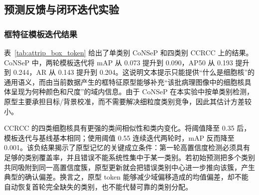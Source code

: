 \begin{table}[t]
\caption{学生网络结构对比}
\label{tab:attrip_architecture}
\begin{center}
\end{center}
\vskip -0.15in
\end{table}

\subsection{预测反馈与闭环迭代实验}

\subsubsection{框特征模板迭代结果}

表~\ref{tab:attrip_box_token} 给出了单类别 CoNSeP 和四类别 CCRCC 上的结果。CoNSeP 中，两轮模板迭代将 mAP 从 0.073 提升到 0.090，AP50 从 0.193 提升到 0.244，AR 从 0.143 提升到 0.204。这说明文本提示只能提供“什么是细胞核”的通用语义，而由当前数据产生的框特征原型能够补充“该批病理图像中的细胞核具体呈现为何种颜色和尺度”的域内信息。由于 CoNSeP 在本实验中按单类别检测，原型主要承担目标/背景校准，而不需要解决细粒度类别竞争，因此其估计方差较小。

CCRCC 的四类细胞核具有更强的类间相似性和类内变化。将阈值降至 0.35 后，模板迭代与基线基本相同；使用阈值 0.55 连续迭代两轮时，mAP 反而降至 0.001。该负结果揭示了原型记忆的关键成立条件：第一轮高置信度检测必须具有足够的类别覆盖率，并且错误不能系统性集中于某一类别。若初始预测把多个类别共同吸附到同一高置信度簇，原型更新就会把错误类别中心进一步推向该簇，产生典型的确认偏差。换言之，原型 token 能够减少域偏移造成的均值偏差，却不能自动恢复首轮完全缺失的类别，也不能代替可靠的类别分配。


